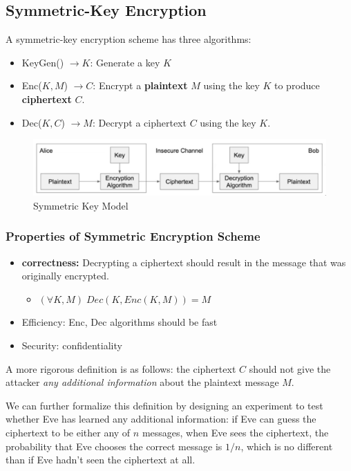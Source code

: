 \documentclass{article}
\begin{document}
\subsection{Symmetric-Key Encryption}
A symmetric-key encryption scheme has three algorithms:
\begin{itemize}
    \item KeyGen() $\rightarrow K$: Generate a key $K$
    \item Enc($K, M$) $\rightarrow C$: Encrypt a \textbf{plaintext} $M$ using the key $K$  to produce \textbf{ciphertext} $C$.
    \item Dec($K, C$) $\rightarrow M$: Decrypt a ciphertext $C$ using the key $K$.
\end{itemize}

\begin{figure}[H]
    \centering
    \includegraphics[scale=0.6]{images/symmetric-key-model.png}
    \caption{Symmetric Key Model}
\end{figure}

\subsubsection{Properties of Symmetric Encryption Scheme}
\begin{itemize}
    \item \textbf{correctness:} Decrypting a ciphertext should result in the message that was originally encrypted.
          \begin{itemize}
              \item $(\forall K, M) \; Dec(K, Enc(K, M)) = M$
          \end{itemize}
    \item Efficiency: Enc, Dec algorithms should be fast
    \item Security: confidentiality
\end{itemize}

\begin{definition}[Confidentiality]
    A more rigorous definition is as follows: the ciphertext $C$ should not give the attacker \emph{any additional information} about the plaintext message $M$.

    We can further formalize this definition by designing an experiment to test whether Eve has learned any additional information: if Eve can guess the ciphertext to be either any of $n$ messages, when Eve sees the ciphertext, the probability that Eve chooses the correct message is $1/n$, which is no different than if Eve hadn't seen the ciphertext at all.
\end{definition}
\end{document}
